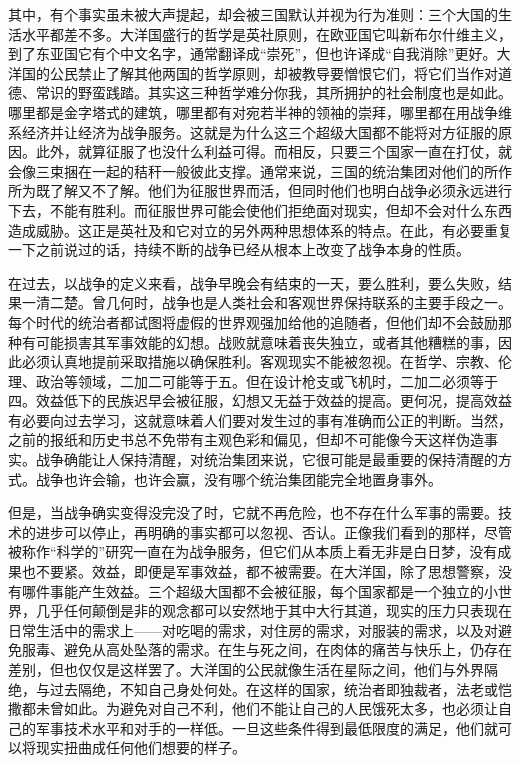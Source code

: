其中，有个事实虽未被大声提起，却会被三国默认并视为行为准则：三个大国的生活水平都差不多。大洋国盛行的哲学是英社原则，在欧亚国它叫新布尔什维主义，到了东亚国它有个中文名字，通常翻译成``崇死''，但也许译成``自我消除''更好。大洋国的公民禁止了解其他两国的哲学原则，却被教导要憎恨它们，将它们当作对道德、常识的野蛮践踏。其实这三种哲学难分你我，其所拥护的社会制度也是如此。哪里都是金字塔式的建筑，哪里都有对宛若半神的领袖的崇拜，哪里都在用战争维系经济并让经济为战争服务。这就是为什么这三个超级大国都不能将对方征服的原因。此外，就算征服了也没什么利益可得。而相反，只要三个国家一直在打仗，就会像三束捆在一起的秸秆一般彼此支撑。通常来说，三国的统治集团对他们的所作所为既了解又不了解。他们为征服世界而活，但同时他们也明白战争必须永远进行下去，不能有胜利。而征服世界可能会使他们拒绝面对现实，但却不会对什么东西造成威胁。这正是英社及和它对立的另外两种思想体系的特点。在此，有必要重复一下之前说过的话，持续不断的战争已经从根本上改变了战争本身的性质。

在过去，以战争的定义来看，战争早晚会有结束的一天，要么胜利，要么失败，结果一清二楚。曾几何时，战争也是人类社会和客观世界保持联系的主要手段之一。每个时代的统治者都试图将虚假的世界观强加给他的追随者，但他们却不会鼓励那种有可能损害其军事效能的幻想。战败就意味着丧失独立，或者其他糟糕的事，因此必须认真地提前采取措施以确保胜利。客观现实不能被忽视。在哲学、宗教、伦理、政治等领域，二加二可能等于五。但在设计枪支或飞机时，二加二必须等于四。效益低下的民族迟早会被征服，幻想又无益于效益的提高。更何况，提高效益有必要向过去学习，这就意味着人们要对发生过的事有准确而公正的判断。当然，之前的报纸和历史书总不免带有主观色彩和偏见，但却不可能像今天这样伪造事实。战争确能让人保持清醒，对统治集团来说，它很可能是最重要的保持清醒的方式。战争也许会输，也许会赢，没有哪个统治集团能完全地置身事外。

但是，当战争确实变得没完没了时，它就不再危险，也不存在什么军事的需要。技术的进步可以停止，再明确的事实都可以忽视、否认。正像我们看到的那样，尽管被称作``科学的''研究一直在为战争服务，但它们从本质上看无非是白日梦，没有成果也不要紧。效益，即便是军事效益，都不被需要。在大洋国，除了思想警察，没有哪件事能产生效益。三个超级大国都不会被征服，每个国家都是一个独立的小世界，几乎任何颠倒是非的观念都可以安然地于其中大行其道，现实的压力只表现在日常生活中的需求上——对吃喝的需求，对住房的需求，对服装的需求，以及对避免服毒、避免从高处坠落的需求。在生与死之间，在肉体的痛苦与快乐上，仍存在差别，但也仅仅是这样罢了。大洋国的公民就像生活在星际之间，他们与外界隔绝，与过去隔绝，不知自己身处何处。在这样的国家，统治者即独裁者，法老或恺撒都未曾如此。为避免对自己不利，他们不能让自己的人民饿死太多，也必须让自己的军事技术水平和对手的一样低。一旦这些条件得到最低限度的满足，他们就可以将现实扭曲成任何他们想要的样子。

